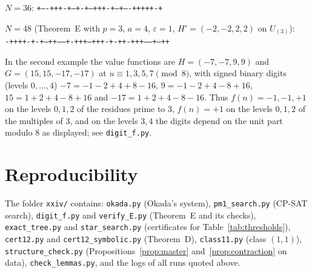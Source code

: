 \documentclass[11pt,a4paper]{article}
\theoremstyle{definition}
\theoremstyle{remark}
\newcommand{\Uu}[1]{U_{(#1)}}
\begin{document}
\smallskip
\noindent$N=36$: \texttt{+----+++-+--+-+--+++-+--+----+++++-+}

\smallskip
\noindent$N=48$ (Theorem~E with $p=3$, $a=4$, $\varepsilon=1$, $H'=(-2,-2,2,2)$ on $\Uu3$):\\
\texttt{-++++-+-+--++------+-+++--+++-+-++-+++-----+--++}

\smallskip
In the second example the value functions are $H=(-7,-7,9,9)$ and $G=(15,15,-17,-17)$ at $u\equiv1,3,5,7\pmod 8$, with signed binary digits (levels $0,\dots,4$) $-7=-1-2+4+8-16$, $9=-1-2+4-8+16$, $15=1+2+4-8+16$ and $-17=1+2+4-8-16$. Thus $f(n)=-1,-1,+1$ on the levels $0,1,2$ of the residues prime to $3$, $f(n)=+1$ on the levels $0,1,2$ of the multiples of $3$, and on the levels $3,4$ the digits depend on the unit part modulo $8$ as displayed; see \texttt{digit\_f.py}.

\section{Reproducibility}\label{sec:repro}
The folder \texttt{xxiv/} contains: \texttt{okada.py} (Okada's system), \texttt{pm1\_search.py} (CP-SAT search), \texttt{digit\_f.py} and \texttt{verify\_E.py} (Theorem~E and its checks), \texttt{exact\_tree.py} and \texttt{star\_search.py} (certificates for Table~\ref{tab:thresholds}), \texttt{cert12.py} and \texttt{cert12\_symbolic.py} (Theorem~D), \texttt{class11.py} (class $(1,1)$), \texttt{structure\_check.py} (Propositions~\ref{prop:master} and~\ref{prop:contraction} on data), \texttt{check\_lemmas.py}, and the logs of all runs quoted above.
\end{document}
